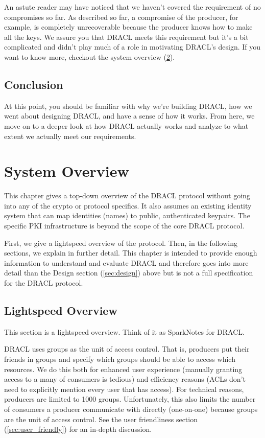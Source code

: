 \documentclass[pdftex,12pt,a4papaer,twoside,notitlepage]{report}
\begin{document}
An astute reader may have noticed that we haven't covered the requirement of no
compromises so far. As described so far, a compromise of the producer, for
example, is completely unrecoverable because the producer knows how to make all
the keys. We assure you that DRACL meets this requirement but it's a bit
complicated and didn't play much of a role in motivating DRACL's design. If you
want to know more, checkout the system overview (\cref{chap:system-overview}).

\section{Conclusion}

At this point, you should be familiar with why we're building DRACL, how we went
about designing DRACL, and have a sense of how it works. From here, we move on
to a deeper look at how DRACL actually works and analyze to what extent we
actually meet our requirements.

\chapter{System Overview}
\label{chap:system-overview}

This chapter gives a top-down overview of the DRACL protocol without going into
any of the crypto or protocol specifics. It also assumes an existing identity
system that can map identities (names) to public, authenticated keypairs. The
specific PKI infrastructure is beyond the scope of the core DRACL protocol.

First, we give a lightspeed overview of the protocol. Then, in the following
sections, we explain in further detail. This chapter is intended to provide
enough information to understand and evaluate DRACL and therefore goes into more
detail than the Design section (\cref{sec:design}) above but is not a full
specification for the DRACL protocol.

\section{Lightspeed Overview}

This section is a lightspeed overview. Think of it as SparkNotes\texttrademark{}
for DRACL.

DRACL uses groups as the unit of access control. That is, producers put their
friends in groups and specify which groups should be able to access which
resources. We do this both for enhanced user experience (manually granting
access to a many of consumers is tedious) and efficiency reasons (ACLs don't
need to explicitly mention every user that has access). For technical reasons,
producers are limited to 1000 groups. Unfortunately, this also limits the number
of consumers a producer communicate with directly (one-on-one) because groups
are the unit of access control. See the user friendliness section
(\cref{sec:user_friendly}) for an in-depth discussion.
\end{document}
